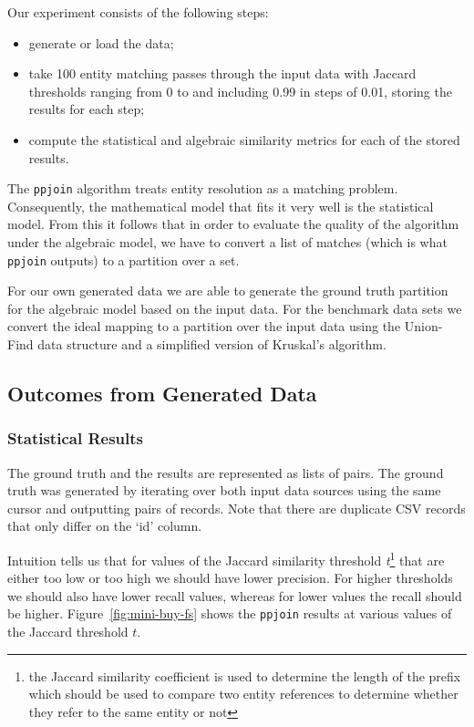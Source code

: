 Our experiment consists of the following steps:

\begin{itemize}
    \item generate or load the data;
    \item take 100 entity matching passes through the input data with
          Jaccard thresholds ranging from 0 to and including 0.99 in steps of
          0.01, storing the results for each step;
    \item compute the statistical and algebraic similarity metrics for each
          of the stored results.
\end{itemize}

The \texttt{ppjoin} algorithm treats entity resolution as a matching problem.
Consequently, the mathematical model that fits it very well is the statistical
model.
From this it follows that in order to evaluate the quality of the algorithm
under the algebraic model, we have to convert a list of matches (which is what
\texttt{ppjoin} outputs) to a partition over a set.

For our own generated data we are able to generate the ground truth partition
for the algebraic model based on the input data.
For the benchmark data sets we convert the ideal mapping to a partition over the
input data using the Union-Find data structure and a simplified version of
Kruskal's algorithm.

\subsection{Outcomes from Generated Data}\label{subsec:experiment-mini-buy}

\subsubsection{Statistical Results}

The ground truth and the results are represented as lists of pairs.
The ground truth was generated by iterating over both input data sources using
the same cursor and outputting pairs of records.
Note that there are duplicate CSV records that only differ on the `id' column.

Intuition tells us that for values of the Jaccard similarity threshold
\textit{t}\footnote[1]{the Jaccard similarity coefficient is used to determine
the length of the prefix which should be used to compare two entity references
to determine whether they refer to the same entity or not} that are either too
low or too high we should have lower precision.
For higher thresholds we should also have lower recall values, whereas for
lower values the recall should be higher.
Figure~\ref{fig:mini-buy-fs} shows the \texttt{ppjoin} results at various
values of the Jaccard threshold $t$.


